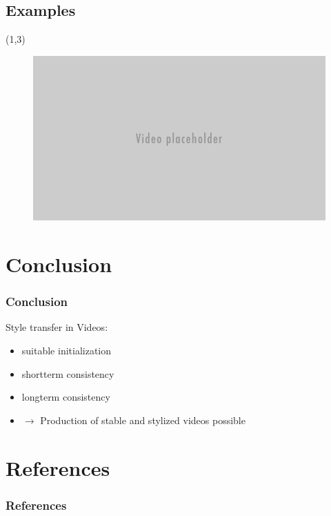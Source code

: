 \documentclass{beamer} %
\begin{document}
\subsection{Examples}
\begin{frame}

\begin{textblock}{5}(1,3)
	\begin{figure}
	\includegraphics[scale=0.5]{figures/placeholder.png}
	
	\end{figure}
 \end{textblock} 



\end{frame}

\section{Conclusion}
\begin{frame}
\frametitle{Conclusion}

Style transfer in Videos: 
\begin{itemize}
\item suitable initialization
\item shortterm consistency
\item longterm consistency 
\item $\longrightarrow$ Production of stable and stylized videos possible

\end{itemize}
\end{frame}
\section{References}
\begin{frame}
\frametitle{References}
\nocite{*}



\end{frame}
\end{document}
